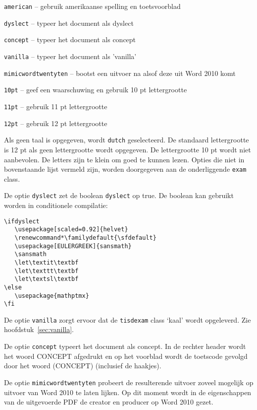 \documentclass[dutch,a4paper,12pt,addpoints,fleqn,oneside]{tisdexam}
\newcommand\DocClass[1]{\texttt{#1}}
\newcommand\Option[1]{\texttt{#1}}
\begin{document}
\Option{american} -- gebruik amerikaanse spelling en toetsvoorblad

\Option{dyslect} -- typeer het document als dyslect

\Option{concept} -- typeer het document als concept

\Option{vanilla} -- typeer het document als 'vanilla'

\Option{mimicwordtwentyten} -- bootst een uitvoer na alsof deze uit Word 2010 komt

\Option{10pt} -- geef een waarschuwing en gebruik 10 pt lettergrootte%

\Option{11pt} -- gebruik 11 pt lettergrootte

\Option{12pt} -- gebruik 12 pt lettergrootte

\bigskip
Als geen taal is opgegeven, wordt \Option{dutch} geselecteerd.
De standaard lettergrootte is 12 pt als geen lettergrootte wordt opgegeven.
De lettergrootte 10 pt wordt niet aanbevolen. De letters zijn te klein om
goed te kunnen lezen.
Opties die niet in bovenstaande lijst vermeld zijn, worden doorgegeven aan
de onderliggende \DocClass{exam} class.

\medskip
De optie \Option{dyslect} zet de boolean \Option{dyslect} op true. De boolean
kan gebruikt worden in conditionele compilatie:

\begin{lstlisting}
\ifdyslect
   \usepackage[scaled=0.92]{helvet}
   \renewcommand*\familydefault{\sfdefault}
   \usepackage[EULERGREEK]{sansmath}
   \sansmath
   \let\textit\textbf
   \let\texttt\textbf
   \let\textsl\textbf
\else
   \usepackage{mathptmx}
\fi
\end{lstlisting}


\medskip
De optie \Option{vanilla} zorgt ervoor dat de \DocClass{tisdexam} class `kaal'
wordt opgeleverd. Zie hoofdstuk~\ref{sec:vanilla}.

\medskip
De optie \Option{concept} typeert het document als concept. In de rechter header
wordt het woord CONCEPT afgedrukt en op het voorblad wordt de toetscode
gevolgd door het woord (CONCEPT) (inclusief de haakjes).

\medskip
De optie \Option{mimicwordtwentyten} probeert de resulterende uitvoer zoveel
mogelijk op uitvoer van Word 2010 te laten lijken. Op dit moment wordt in de
eigenschappen van de uitgevoerde PDF de creator en producer op Word 2010 gezet.
\end{document}
